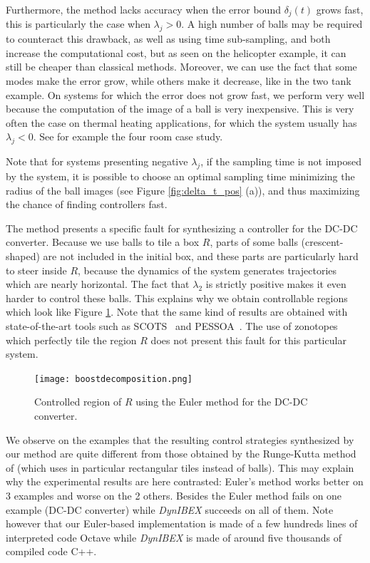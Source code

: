 Furthermore, the method lacks accuracy when the error bound $\delta_j(t)$ grows fast, 
this is particularly the case when $\lambda_j >0$. 
A high number of balls may be required to counteract this drawback, as well
as using time sub-sampling, and both increase the computational cost,
but as seen on the helicopter
example, it can still be 
cheaper than classical methods. Moreover, we can 
use the fact that some modes make the error grow, while others
make it decrease, like in the two tank example.
On systems for which the error does not grow fast, we perform very well 
because the computation of the image of a ball is very inexpensive. 
This is very often the case on
thermal heating applications, for which the system usually has $\lambda_j <0$.
See for example the four room case study.

Note that for systems presenting negative $\lambda_j$,
if the sampling time is not imposed by the system, 
it is possible to choose 
an optimal sampling time minimizing the radius of the ball images
(see Figure \ref{fig:delta_t_pos} (a)), and thus maximizing the chance of 
finding controllers fast.

The method presents a specific fault for synthesizing 
a controller for the DC-DC converter. 
Because we use balls to tile a box $R$, parts of some balls (crescent-shaped)
are not included in the initial 
box, and these parts are particularly hard to steer inside $R$, because the dynamics 
of the system generates trajectories which are nearly horizontal. The fact that $\lambda_2$
is strictly positive makes it even harder to control these balls.
This explains why we obtain controllable regions which look like Figure \ref{fig:boost_dec}.
Note that the same kind of results are obtained with state-of-the-art tools such 
as SCOTS~\cite{SCOTS}  and PESSOA~\cite{Mazo2010}. The use of zonotopes
which perfectly tile the region $R$ does not present this fault for this particular system. 

\begin{figure}[h]
 \centering
 \texttt{[image: boostdecomposition.png]}
 \caption{Controlled region of $R$ using the Euler method for the DC-DC converter.}
 \label{fig:boost_dec}
\end{figure}

We observe on the examples that the resulting control strategies 
synthesized by our method are quite different from those obtained
by the Runge-Kutta method of \cite{NL_minimator} 
(which uses in particular rectangular tiles instead of balls). 
This may explain why the experimental results are here contrasted:
Euler's method works better on 3 examples and worse on the 2 others.
Besides the Euler method fails on one example (DC-DC converter) while {\em DynIBEX} succeeds 
on all of them. Note however that our Euler-based implementation is made
of a few hundreds lines of interpreted code Octave while {\em DynIBEX} is 
made of around five thousands of compiled code C++.

